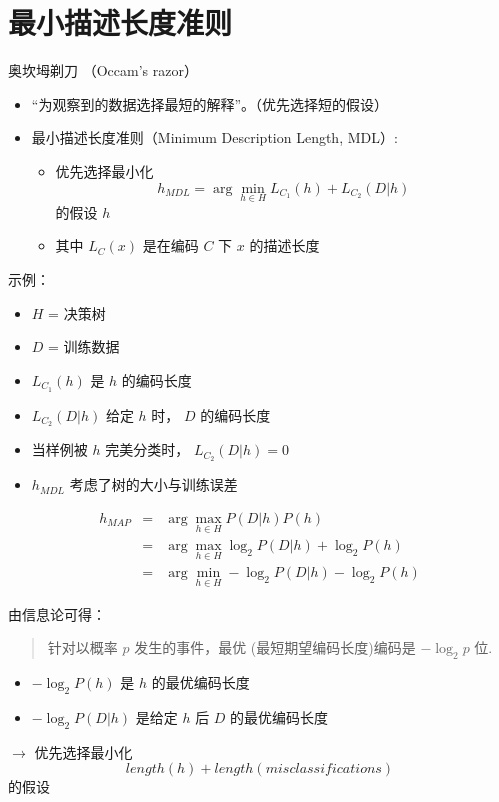 \documentclass[presentation]{beamer}
\begin{document}
\section{最小描述长度准则}
\label{sec:orgcbeccad}
\begin{frame}[label={sec:orga0ccef2}]{奥坎坶剃刀 （Occam's razor）}
\begin{itemize}
\item “为观察到的数据选择最短的解释”。（优先选择短的假设）
\item 最小描述长度准则（Minimum Description Length, MDL）: 
\begin{itemize}
\item 优先选择最小化
$$h_{MDL} = \arg \min_{h \in H} L_{C_{1}}(h) + L_{C_{2}}(D|h)$$
的假设 \(h\)
\item 其中 \(L_{C}(x)\) 是在编码 \(C\) 下 \(x\) 的描述长度
\end{itemize}
\end{itemize}
\end{frame}

\begin{frame}[label={sec:org84dc564}]{示例：}
\begin{itemize}
\item \(H\) = 决策树
\item \(D\) = 训练数据
\item \(L_{C_{1}}(h)\)  是 \(h\) 的编码长度
\item \(L_{C_{2}}(D|h)\) 给定 \(h\) 时， \(D\) 的编码长度
\item 当样例被 \(h\) 完美分类时， \(L_{C_{2}}(D|h)=0\)
\item \(h_{MDL}\) 考虑了树的大小与训练误差
\end{itemize}

\begin{eqnarray}
h_{MAP} &= &\arg \max_{h \in H}P(D|h) P(h) \nonumber \\
&= &\arg \max_{h \in H} \log_{2} P(D|h) + \log_{2} P(h)  \nonumber \\
&= &\arg \min_{h \in H} - \log_{2} P(D|h) - \log_{2} P(h) 
\end{eqnarray}
\end{frame}

\begin{frame}[label={sec:orga70ec84}]{由信息论可得：}
\begin{quote}
针对以概率 $p$ 发生的事件，最优 (最短期望编码长度)编码是 $- \log_{2} p$ 位.
\end{quote}

\begin{itemize}
\item \(- \log_{2} P(h)\) 是 \(h\) 的最优编码长度
\item \(- \log_{2} P(D|h)\) 是给定 \(h\) 后 \(D\) 的最优编码长度
\end{itemize}

\(\rightarrow\) 优先选择最小化
$$length(h) + length(misclassifications)$$
的假设
\end{frame}
\end{document}
